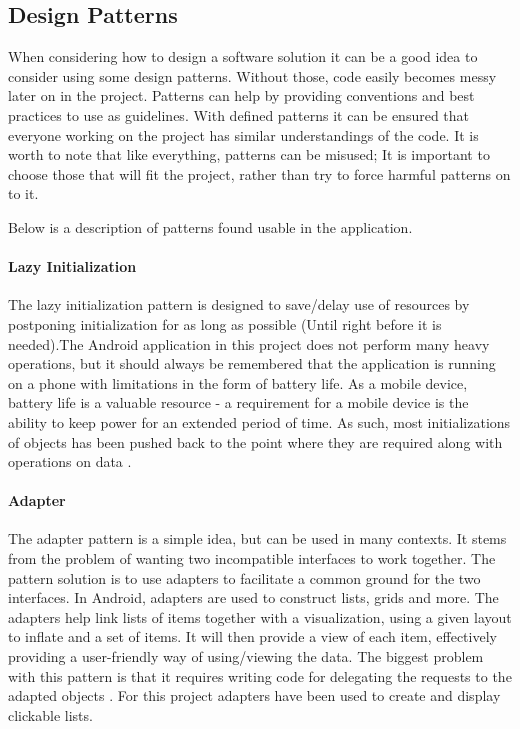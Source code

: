 \subsection{Design Patterns}\label{subsec:patterns}
When considering how to design a software solution it can be a good idea to consider using some design patterns. Without those, code easily becomes messy later on in the project. Patterns can help by providing conventions and best practices to use as guidelines. With defined patterns it can be ensured that everyone working on the project has similar understandings of the code. It is worth to note that like everything, patterns can be misused; It is important to choose those that will fit the project, rather than try to force harmful patterns on to it. 

Below is a description of patterns found usable in the application.

\paragraph{Lazy Initialization}

The lazy initialization pattern is designed to save/delay use of resources by postponing initialization for as long as possible (Until right before it is needed).The Android application in this project does not perform many heavy operations, but it should always be remembered that the application is running on a phone with limitations in the form of battery life. As a mobile device, battery life is a valuable resource - a requirement for a mobile device is the ability to keep power for an extended period of time. As such, most initializations of objects has been pushed back to the point where they are required along with operations on data \cite{lazyInit}.

\paragraph{Adapter}
The adapter pattern is a simple idea, but can be used in many contexts. It stems from the problem of wanting two incompatible interfaces to work together. The pattern solution is to use adapters to facilitate a common ground for the two interfaces. In Android, adapters are used to construct lists, grids and more. The adapters help link lists of items together with a visualization, using a given layout to inflate and a set of items. It will then provide a view of each item, effectively providing a user-friendly way of using/viewing the data. The biggest problem with this pattern is that it requires writing code for delegating the requests to the adapted objects \cite{adappat}. For this project adapters have been used to create and display clickable lists.

